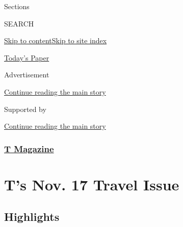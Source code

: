 Sections

SEARCH

\protect\hyperlink{site-content}{Skip to
content}\protect\hyperlink{site-index}{Skip to site index}

\href{https://myaccount.nytimes.com/auth/login?response_type=cookie\&client_id=vi}{}

\href{https://www.nytimes.com/section/todayspaper}{Today's Paper}

Advertisement

\protect\hyperlink{after-top}{Continue reading the main story}

Supported by

\protect\hyperlink{after-sponsor}{Continue reading the main story}

\hypertarget{t-magazine}{%
\subsubsection{\texorpdfstring{\href{/section/t-magazine}{T
Magazine}}{T Magazine}}\label{t-magazine}}

\hypertarget{ts-nov-17-travel-issue}{%
\section{T's Nov. 17 Travel Issue}\label{ts-nov-17-travel-issue}}

\hypertarget{highlights}{%
\subsection{Highlights}\label{highlights}}

